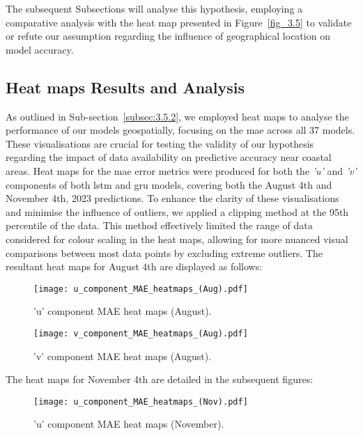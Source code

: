 The subsequent Subsections will analyse this hypothesis, employing a comparative analysis with the heat map presented in Figure~\ref{fig_3.5} to validate or refute our assumption regarding the influence of geographical location on model accuracy.

\subsection{Heat maps Results and Analysis}
\label{subsec:4.2.2}

As outlined in Sub-section~\ref{subsec:3.5.2}, we employed heat maps to analyse the performance of our models geospatially, focusing on the \acrshort{mae} across all 37 models. These visualisations are crucial for testing the validity of our hypothesis regarding the impact of data availability on predictive accuracy near coastal areas. Heat maps for the \acrshort{mae} error metrics were produced for both the \textit{'u'} and \textit{'v'} components of both \acrshort{lstm} and \acrshort{gru} models, covering both the August 4th and November 4th, 2023 predictions. To enhance the clarity of these visualisations and minimise the influence of outliers, we applied a clipping method at the 95th percentile of the data. This method effectively limited the range of data considered for colour scaling in the heat maps, allowing for more nuanced visual comparisons between most data points by excluding extreme outliers. The resultant heat maps for August 4th are displayed as follows:

\begin{figure}[htbp]
    \centering
    \texttt{[image: u\_component\_MAE\_heatmaps\_(Aug).pdf]}
    \caption[Short sample caption.]{'u' component MAE heat maps (August).\label{fig_4.2}}
\end{figure}

\begin{figure}[htbp]
    \centering
    \texttt{[image: v\_component\_MAE\_heatmaps\_(Aug).pdf]}
    \caption[Short sample caption.]{'v' component MAE heat maps (August).\label{fig_4.3}}
\end{figure}
The heat maps for November 4th are detailed in the subsequent figures:

\begin{figure}[htbp]
    \centering
    \texttt{[image: u\_component\_MAE\_heatmaps\_(Nov).pdf]}
    \caption[Short sample caption.]{'u' component MAE heat maps (November).\label{fig_4.4}}
\end{figure}


